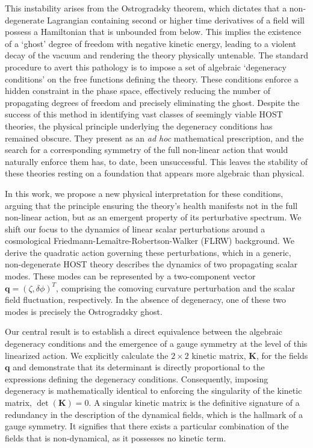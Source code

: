 \documentclass[twocolumn]{aastex631}
\begin{document}
This instability arises from the Ostrogradsky theorem, which dictates that a non-degenerate Lagrangian containing second or higher time derivatives of a field will possess a Hamiltonian that is unbounded from below. This implies the existence of a `ghost' degree of freedom with negative kinetic energy, leading to a violent decay of the vacuum and rendering the theory physically untenable. The standard procedure to avert this pathology is to impose a set of algebraic `degeneracy conditions' on the free functions defining the theory. These conditions enforce a hidden constraint in the phase space, effectively reducing the number of propagating degrees of freedom and precisely eliminating the ghost. Despite the success of this method in identifying vast classes of seemingly viable HOST theories, the physical principle underlying the degeneracy conditions has remained obscure. They present as an \textit{ad hoc} mathematical prescription, and the search for a corresponding symmetry of the full non-linear action that would naturally enforce them has, to date, been unsuccessful. This leaves the stability of these theories resting on a foundation that appears more algebraic than physical.

In this work, we propose a new physical interpretation for these conditions, arguing that the principle ensuring the theory's health manifests not in the full non-linear action, but as an emergent property of its perturbative spectrum. We shift our focus to the dynamics of linear scalar perturbations around a cosmological Friedmann-Lema\^itre-Robertson-Walker (FLRW) background. We derive the quadratic action governing these perturbations, which in a generic, non-degenerate HOST theory describes the dynamics of two propagating scalar modes. These modes can be represented by a two-component vector $\mathbf{q} = (\zeta, \delta\phi)^T$, comprising the comoving curvature perturbation and the scalar field fluctuation, respectively. In the absence of degeneracy, one of these two modes is precisely the Ostrogradsky ghost.

Our central result is to establish a direct equivalence between the algebraic degeneracy conditions and the emergence of a gauge symmetry at the level of this linearized action. We explicitly calculate the $2 \times 2$ kinetic matrix, $\mathbf{K}$, for the fields $\mathbf{q}$ and demonstrate that its determinant is directly proportional to the expressions defining the degeneracy conditions. Consequently, imposing degeneracy is mathematically identical to enforcing the singularity of the kinetic matrix, $\det(\mathbf{K}) = 0$. A singular kinetic matrix is the definitive signature of a redundancy in the description of the dynamical fields, which is the hallmark of a gauge symmetry. It signifies that there exists a particular combination of the fields that is non-dynamical, as it possesses no kinetic term.
\end{document}

